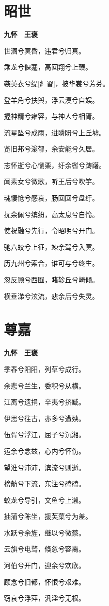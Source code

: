 \documentclass[12pt,a4paper]{ctexbook}
\begin{document}
\section{昭世}
\textbf{九怀　王褒}\par\vspace{0.5em}
世溷兮冥昏，违君兮归真。\par
乘龙兮偃蹇，高回翔兮上臻。\par
袭英衣兮缇[糹習]，披华裳兮芳芬。\par
登羊角兮扶舆，浮云漠兮自娱。\par
握神精兮雍容，与神人兮相胥。\par
流星坠兮成雨，进瞵盼兮上丘墟。\par
览旧邦兮滃郁，余安能兮久居。\par
志怀逝兮心懰栗，纡余辔兮踌躇。\par
闻素女兮微歌，听王后兮吹竽。\par
魂悽怆兮感哀，肠回回兮盘纡。\par
抚余佩兮缤纷，高太息兮自怜。\par
使祝融兮先行，令昭明兮开门。\par
驰六蛟兮上征，竦余驾兮入冥。\par
历九州兮索合，谁可与兮终生。\par
忽反顾兮西囿，睹轸丘兮崎倾。\par
横垂涕兮泫流，悲余后兮失灵。\par

\section{尊嘉}
\textbf{九怀　王褒}\par\vspace{0.5em}
季春兮阳阳，列草兮成行。\par
余悲兮兰生，委积兮从横。\par
江离兮遗捐，辛夷兮挤臧。\par
伊思兮往古，亦多兮遭殃。\par
伍胥兮浮江，屈子兮沉湘。\par
运余兮念兹，心内兮怀伤。\par
望淮兮沛沛，滨流兮则逝。\par
榜舫兮下流，东注兮磕磕。\par
蛟龙兮导引，文鱼兮上濑。\par
抽蒲兮陈坐，援芙蕖兮为盖。\par
水跃兮余旌，继以兮微蔡。\par
云旗兮电骛，倏忽兮容裔。\par
河伯兮开门，迎余兮欢欣。\par
顾念兮旧都，怀恨兮艰难。\par
窃哀兮浮萍，汎淫兮无根。\par
\end{document}
